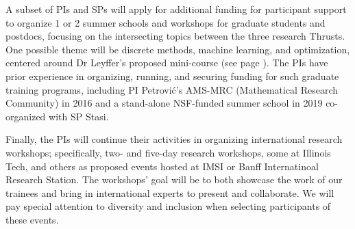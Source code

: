 \documentclass[11pt]{NSFamsart}
\begin{document}
A subset of  PIs and SPs will apply for additional funding for participant support to organize 1 or 2 summer schools and workshops for graduate students and postdocs, focusing on the intersecting topics between the three research Thrusts. One possible theme will be discrete methods, machine learning, and optimization, centered around Dr Leyffer's proposed mini-course (see page \pageref{mini courses}). 
The PIs have prior experience in organizing, running, and securing funding for such graduate training programs, including  PI Petrovi\'c's AMS-MRC (Mathematical Research Community) in 2016 and a stand-alone NSF-funded summer school in 2019 co-organized with SP Stasi. %

Finally, the PIs will continue their activities in organizing international research workshops; specifically, two- and five-day  research workshops, some at Illinois Tech, and others  as proposed events hosted at IMSI or Banff Internatinoal Research Station. The workshops' goal will be to both showcase the work of our trainees and bring in international experts to present and collaborate. We will pay special attention to diversity and inclusion when selecting participants of these events. 
\end{document}
